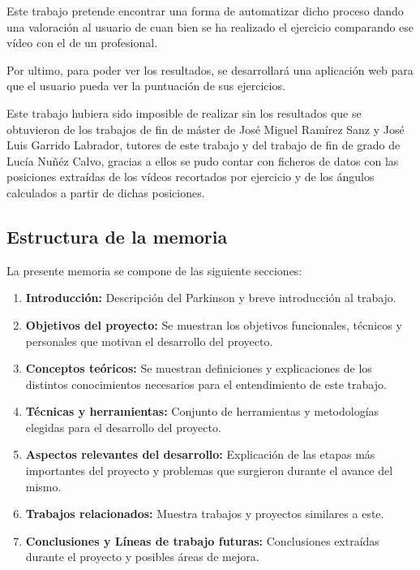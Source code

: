 Este trabajo pretende encontrar una forma de automatizar dicho proceso dando una valoración al usuario de cuan bien se ha realizado el ejercicio comparando ese vídeo con el de un profesional.

Por ultimo, para poder ver los resultados, se desarrollará una aplicación web para que el usuario pueda ver la puntuación de sus ejercicios. 

Este trabajo hubiera sido imposible de realizar sin los resultados que se obtuvieron de los trabajos de fin de máster de José Miguel Ramírez Sanz y José Luis Garrido Labrador, tutores de este trabajo y del trabajo de fin de grado de Lucía Nuñéz Calvo, gracias a ellos se pudo contar con ficheros de datos con las posiciones extraídas de los vídeos recortados por ejercicio y de los ángulos calculados a partir de dichas posiciones.

\subsection{Estructura de la memoria}
La presente memoria se compone de las siguiente secciones:
\begin{enumerate}
	\item \textbf{Introducción:} Descripción del Parkinson y breve introducción al trabajo.
	\item \textbf{Objetivos del proyecto:} Se muestran los objetivos funcionales, técnicos y personales que motivan el desarrollo del proyecto.
	
	\item \textbf{Conceptos teóricos:} Se muestran definiciones y explicaciones de los distintos conocimientos necesarios para el entendimiento de este trabajo.
	
	\item \textbf{Técnicas y herramientas:} Conjunto de herramientas y metodologías elegidas para el desarrollo del proyecto.
	
	\item \textbf{Aspectos relevantes del desarrollo:} Explicación de las etapas más importantes del proyecto y problemas que surgieron durante el avance del mismo.
	
	\item \textbf{Trabajos relacionados:} Muestra trabajos y proyectos similares a este.
	
	\item  \textbf{Conclusiones y Líneas de trabajo futuras:} Conclusiones extraídas durante el proyecto y posibles áreas de mejora.	
\end{enumerate}

